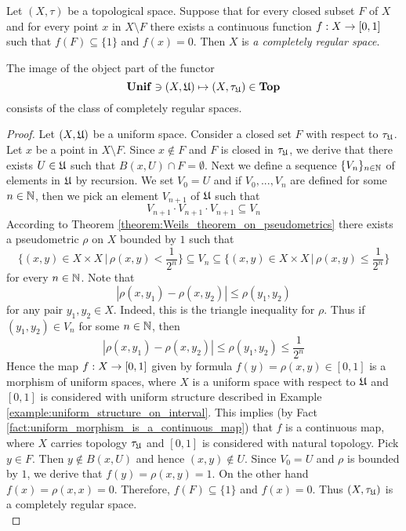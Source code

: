 \begin{definition}
Let $(X,\tau)$ be a topological space. Suppose that for every closed subset $F$ of $X$ and for every point $x$ in $X\setminus  F$ there exists a continuous function $f:X\rightarrow [0,1]$ such that $f(F) \subseteq \{1\}$ and $f(x) = 0$. Then $X$ is \textit{a completely regular space}. 
\end{definition}

\begin{theorem}\label{theorem:image_of_the_canonical_functor_is_completely_regular_space}
The image of the object part of the functor
$$\mathbf{Unif} \ni (X,{\mathfrak U}) \mapsto (X,\tau_{{\mathfrak U}}) \in \mathbf{Top}$$
consists of the class of completely regular spaces.
\end{theorem}
\begin{proof}
Let $(X,{\mathfrak U})$ be a uniform space. Consider a closed set $F$ with respect to $\tau_{{\mathfrak U}}$. Let $x$ be a point in $X\setminus F$. Since $x \not \in F$ and $F$ is closed in $\tau_{{\mathfrak U}}$, we derive that there exists $U \in {\mathfrak U}$ such that $B(x,U)\cap F = \emptyset$. Next we define a sequence $\{V_n\}_{n\in {\mathbb N}}$ of elements in ${\mathfrak U}$ by recursion. We set $V_0 = U$ and if $V_0,...,V_n$ are defined for some $n\in {\mathbb N}$, then we pick an element $V_{n+1}$ of ${\mathfrak U}$ such that 
$$V_{n+1}\cdot V_{n+1}\cdot V_{n+1} \subseteq V_n$$
According to Theorem \ref{theorem:Weils_theorem_on_pseudometrics} there exists a pseudometric $\rho$ on $X$ bounded by $1$ such that
$$\bigg\{(x,y)\in X\times X\,\bigg|\,\rho(x,y)<\frac{1}{2^n}\bigg\} \subseteq V_n \subseteq \bigg\{(x,y)\in X\times X\,\bigg|\,\rho(x,y) \leq \frac{1}{2^n}\bigg\}$$
for every $n\in {\mathbb N}$. Note that
$$|\rho(x,y_1) - \rho(x,y_2)| \leq \rho(y_1,y_2)$$
for any pair $y_1,y_2\in X$. Indeed, this is the triangle inequality for $\rho$. Thus if $(y_1,y_2) \in V_n$ for some $n\in {\mathbb N}$, then
$$|\rho(x,y_1) - \rho(x,y_2)| \leq \rho(y_1,y_2) \leq \frac{1}{2^n}$$
Hence the map $f:X \rightarrow [0,1]$ given by formula $f(y) = \rho(x,y)\in [0,1]$ is a morphism of uniform spaces, where $X$ is a uniform space with respect to ${\mathfrak U}$ and $[0,1]$ is considered with uniform structure described in Example \ref{example:uniform_structure_on_interval}. This implies (by Fact \ref{fact:uniform_morphism_is_a_continuous_map}) that $f$ is a continuous map, where $X$ carries topology $\tau_{{\mathfrak U}}$ and $[0,1]$ is considered with natural topology. Pick $y\in F$. Then $y \not \in B(x,U)$ and hence $(x,y) \not \in U$. Since $V_0 = U$ and $\rho$ is bounded by $1$, we derive that $f(y) = \rho(x,y) = 1$. On the other hand $f(x) = \rho(x,x) = 0$. Therefore, $f(F) \subseteq \{1\}$ and $f(x) = 0$. Thus $(X,\tau_{{\mathfrak U}})$ is a completely regular space.\\

\end{proof}
